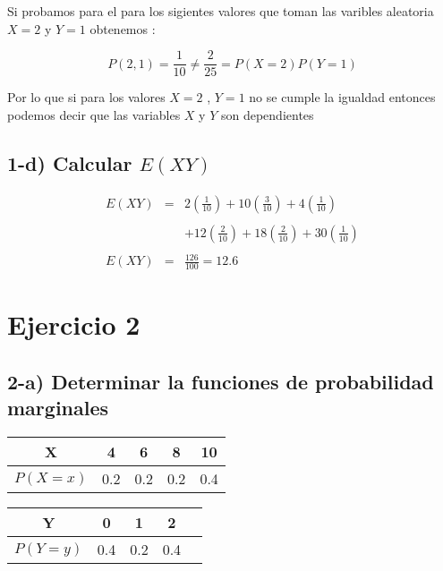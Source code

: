 \documentclass[12pt]{article}
\begin{document}
\begin{flushleft}
    Si probamos para el para los sigientes valores que toman las varibles aleatoria  $X = 2$ y $Y=1 $ obtenemos : 
\end{flushleft}
\begin{equation*}
    P\left(2,1\right)  =  \frac{1}{10} \neq \frac{2}{25}   = P\left(X=2\right) P\left(Y=1\right)
\end{equation*} 
  
\begin{flushleft}
    Por lo que si para los valores $ X = 2 $ , $ Y = 1 $ no se cumple la igualdad entonces podemos decir que las variables 
    $X$ y $Y$ son dependientes 
\end{flushleft}


\subsection*{1-d) Calcular $E\left(XY\right)$ }

\begin{equation*}
    \begin{array}{rcl}
        E\left(XY\right) & = & \displaystyle 2 \left(\frac{1}{10}\right) + 10 \left(\frac{3}{10}\right) + 4 \left(\frac{1}{10}\right)
        \\
        \\
        && \displaystyle  +  12 \left(\frac{2}{10}\right) + 18 \left(\frac{2}{10}\right) + 30 \left(\frac{1}{10}\right)
        \\
        \\
        \displaystyle E\left(XY\right) & = & \displaystyle \frac{126}{100} = 12.6
    \end{array}
\end{equation*}


\section*{Ejercicio 2}

\subsection*{2-a)  Determinar la funciones de probabilidad marginales }

\begin{center}
    \begin{tabular}{|c|c|c|c|c|}
        \hline
        X                   & 4   & 6   & 8   & 10
        \\\hline
        $P\left(X=x\right)$ & 0.2 & 0.2 & 0.2 & 0.4
        \\
        \hline
    \end{tabular}

    \vspace*{0.5cm}
    \begin{tabular}{|c|c|c|c|c|}
        \hline
        Y                   & 0   & 1   & 2
        \\\hline
        $P\left(Y=y\right)$ & 0.4 & 0.2 & 0.4
        \\
        \hline
    \end{tabular}
\end{center}
\end{document}
